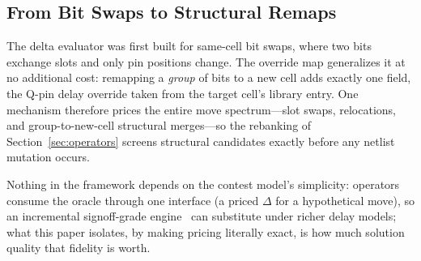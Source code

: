 \subsection{From Bit Swaps to Structural Remaps}
\label{sec:oracle:remaps}

The delta evaluator was first built for same-cell bit swaps, where two bits exchange slots and only pin positions change. The override map generalizes it at no additional cost: remapping a \emph{group} of bits to a new cell adds exactly one field, the Q-pin delay override taken from the target cell's library entry. One mechanism therefore prices the entire move spectrum---slot swaps, relocations, and group-to-new-cell structural merges---so the rebanking of Section~\ref{sec:operators} screens structural candidates exactly before any netlist mutation occurs.

Nothing in the framework depends on the contest model's simplicity: operators consume the oracle through one interface (a priced $\Delta$ for a hypothetical move), so an incremental signoff-grade engine~\cite{huang2021opentimer2} can substitute under richer delay models; what this paper isolates, by making pricing literally exact, is how much solution quality that fidelity is worth.
